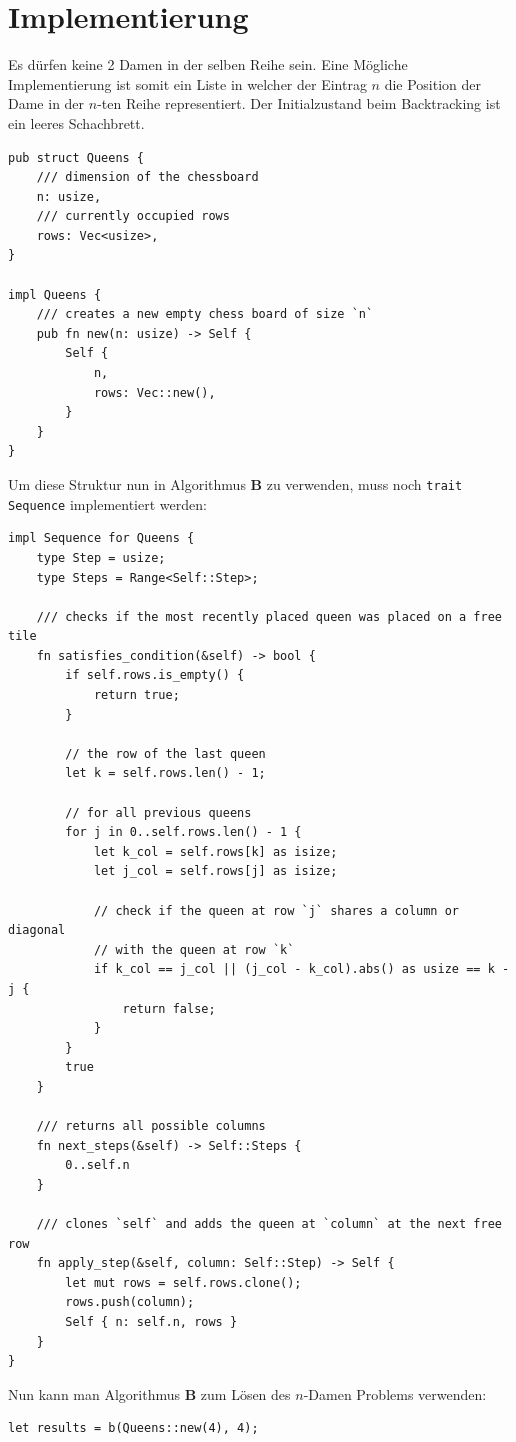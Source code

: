 \section{Implementierung}
Es dürfen keine 2 Damen in der selben Reihe sein. Eine Mögliche Implementierung ist somit ein Liste in welcher der Eintrag
$n$ die Position der Dame in der $n$-ten Reihe representiert. Der Initialzustand beim Backtracking ist ein leeres Schachbrett.
\begin{verbatim}
pub struct Queens {
    /// dimension of the chessboard
    n: usize,
    /// currently occupied rows
    rows: Vec<usize>,
}
  
impl Queens {
    /// creates a new empty chess board of size `n`
    pub fn new(n: usize) -> Self {
        Self {
            n,
            rows: Vec::new(),
        }
    }
}
\end{verbatim}
Um diese Struktur nun in Algorithmus \textbf{B} zu verwenden, muss noch \texttt{trait Sequence} implementiert werden:
\begin{verbatim}
impl Sequence for Queens {
    type Step = usize;
    type Steps = Range<Self::Step>;

    /// checks if the most recently placed queen was placed on a free tile
    fn satisfies_condition(&self) -> bool {
        if self.rows.is_empty() {
            return true;
        }

        // the row of the last queen
        let k = self.rows.len() - 1;

        // for all previous queens
        for j in 0..self.rows.len() - 1 {
            let k_col = self.rows[k] as isize;
            let j_col = self.rows[j] as isize;

            // check if the queen at row `j` shares a column or diagonal
            // with the queen at row `k`
            if k_col == j_col || (j_col - k_col).abs() as usize == k - j {
                return false;
            }
        }
        true
    }

    /// returns all possible columns
    fn next_steps(&self) -> Self::Steps {
        0..self.n
    }

    /// clones `self` and adds the queen at `column` at the next free row
    fn apply_step(&self, column: Self::Step) -> Self {
        let mut rows = self.rows.clone();
        rows.push(column);
        Self { n: self.n, rows }
    }
}
\end{verbatim}
Nun kann man Algorithmus \textbf{B} zum Lösen des $n$-Damen Problems verwenden:
\begin{verbatim}
let results = b(Queens::new(4), 4);
\end{verbatim}
